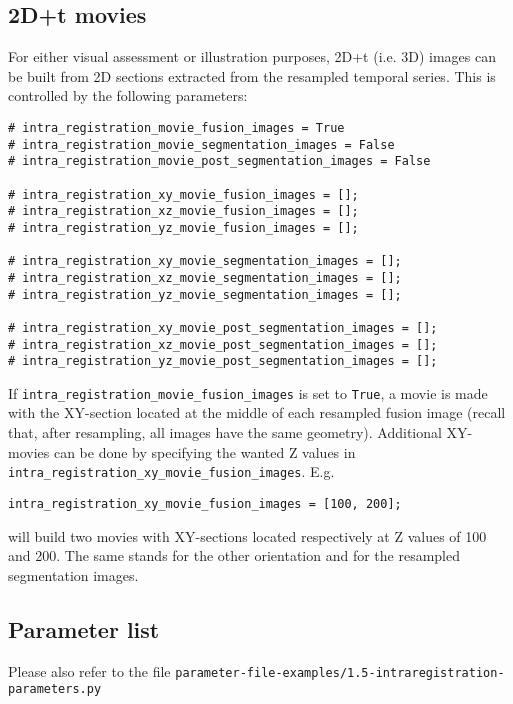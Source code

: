 \subsection{2D+t movies}
\label{sec:cli:intraregistration:movies}
For either visual assessment or illustration purposes, 2D+t (i.e. 3D) images can be built from 2D sections extracted from the resampled temporal series. This is controlled by the following parameters:
\begin{verbatim}
# intra_registration_movie_fusion_images = True
# intra_registration_movie_segmentation_images = False
# intra_registration_movie_post_segmentation_images = False

# intra_registration_xy_movie_fusion_images = [];
# intra_registration_xz_movie_fusion_images = [];
# intra_registration_yz_movie_fusion_images = [];

# intra_registration_xy_movie_segmentation_images = [];
# intra_registration_xz_movie_segmentation_images = [];
# intra_registration_yz_movie_segmentation_images = [];

# intra_registration_xy_movie_post_segmentation_images = [];
# intra_registration_xz_movie_post_segmentation_images = [];
# intra_registration_yz_movie_post_segmentation_images = [];
\end{verbatim}

If \verb|intra_registration_movie_fusion_images| is set to \verb|True|, a movie is made with the  XY-section located at the middle of each resampled fusion image (recall that, after resampling, all images have the same geometry). Additional XY-movies can be done by specifying the wanted Z values in \verb|intra_registration_xy_movie_fusion_images|. E.g.
\begin{verbatim}
intra_registration_xy_movie_fusion_images = [100, 200];
\end{verbatim}
will build two movies with XY-sections located respectively at Z values of 100 and 200. The same stands for the other orientation and for the resampled segmentation images.

\subsection{Parameter list}

Please also refer to the file
\texttt{parameter-file-examples/1.5-intraregistration-parameters.py}

